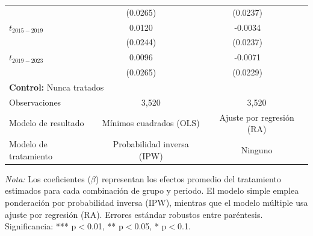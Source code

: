 \documentclass{article}
\begin{document}
\begin{table}[H]
\begin{tabular}{lcccc}
                 & (0.0265) &  & (0.0237) &  \\
$t_{2015-2019}$ & 0.0120 &  & -0.0034 &  \\
                 & (0.0244) &  & (0.0237) &  \\
$t_{2019-2023}$ & 0.0096 &  & -0.0071 &  \\
                 & (0.0265) &  & (0.0229) &  \\
\hline
\multicolumn{5}{l}{\textbf{Control:} Nunca tratados} \\
\hline
Observaciones & \multicolumn{2}{c}{3,520} & \multicolumn{2}{c}{3,520} \\
Modelo de resultado & \multicolumn{2}{c}{Mínimos cuadrados (OLS)} & \multicolumn{2}{c}{Ajuste por regresión (RA)} \\
Modelo de tratamiento & \multicolumn{2}{c}{Probabilidad inversa (IPW)} & \multicolumn{2}{c}{Ninguno} \\
\hline
\end{tabular}
\parbox[t]{\textwidth}{%
\vspace{0.5em}
\footnotesize{\textit{Nota:} Los coeficientes ($\beta$) representan los efectos promedio del tratamiento estimados para cada combinación de grupo y periodo. El modelo simple emplea ponderación por probabilidad inversa (IPW), mientras que el modelo múltiple usa ajuste por regresión (RA). Errores estándar robustos entre paréntesis. Significancia: *** p$<$0.01, ** p$<$0.05, * p$<$0.1.}}
\end{table}
\end{document}
